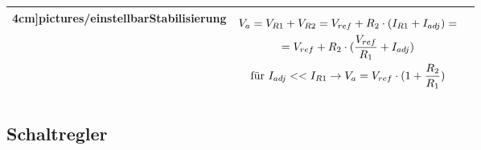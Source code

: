 \begin{longtable}{|l|l|l|}
\begin{minipage}{6cm}
4cm]{pictures/einstellbarStabilisierung}
\end{minipage}
&
\begin{minipage}{8cm}
\begin{gather*}
V_{a}=V_{R1}+V_{R2}=V_{ref}+R_{2} \cdot (I_{R1}+I_{adj})=\notag\\=V_{ref}+R_{2} \cdot (\frac{V_{ref}}{R_{1}}+I_{adj})\\
\text{für }I_{adj}<< I_{R1} \to V_{a}=V_{ref} \cdot (1+\frac{R_{2}}{R_{1}})
\end{gather*}
\end{minipage}
\\
\hline
\end{longtable}


\subsection{Schaltregler} 
